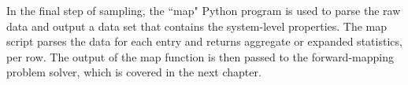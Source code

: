 In the final step of sampling, the ``map" Python program is used to parse the raw data and output a data set that contains the system-level properties.
The map script parses the data for each entry and returns aggregate or expanded statistics, per row.
The output of the map function is then passed to the forward-mapping problem solver, which is covered in the next chapter.









